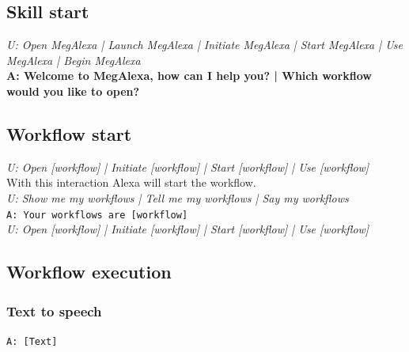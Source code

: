 \subsection{Skill start} \label{SkillStart}
\textit{U: Open MegAlexa | Launch MegAlexa | Initiate MegAlexa | Start MegAlexa | Use MegAlexa | Begin MegAlexa}\\
\textbf{A: Welcome to MegAlexa, how can I help you? | Which workflow would you like to open?}

\subsection{Workflow start}
\textit{U: Open [workflow] | Initiate [workflow] | Start [workflow] | Use [workflow]}\\
With this interaction Alexa will start the workflow. \\
\textit{U: Show me my workflows | Tell me my workflows | Say my workflows}\\
\texttt{A: Your workflows are [workflow]}\\
\textit{U: Open [workflow] | Initiate [workflow] | Start [workflow] | Use [workflow]}

\subsection{Workflow execution}

\subsubsection{Text to speech}
\texttt{A: [Text]}


